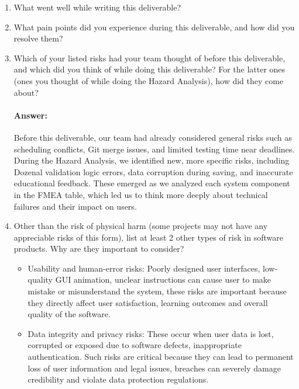 \documentclass{article}
\begin{document}



\begin{enumerate}
    \item What went well while writing this deliverable? 
    \item What pain points did you experience during this deliverable, and how
    did you resolve them?
    \item Which of your listed risks had your team thought of before this
    deliverable, and which did you think of while doing this deliverable? For
    the latter ones (ones you thought of while doing the Hazard Analysis), how
    did they come about?
    \paragraph{Answer:}
    Before this deliverable, our team had already considered general risks such as scheduling conflicts, Git merge issues, and limited testing time near deadlines.
    During the Hazard Analysis, we identified new, more specific risks, including Dozenal validation logic errors, data corruption during saving, and inaccurate educational feedback. These emerged as we analyzed each system component in the FMEA table, which led us to think more deeply about technical failures and their impact on users.
    \item Other than the risk of physical harm (some projects may not have any
    appreciable risks of this form), list at least 2 other types of risk in
    software products. Why are they important to consider? 
	\begin{itemize}
	\item Usability and human-error risks: Poorly designed user interfaces, low-quality GUI animation, unclear instructions can cause user to make mistake or misunderstand the system, these risks are important because they directly affect user satisfaction, learning outcomes and overall quality of the software.
	\item Data integrity and privacy risks: These occur when user data is lost, corrupted or exposed due to software defects, inappropriate authentication. Such risks are critical because they can lead to permanent loss of user information and legal issues, breaches can severely damage credibility and violate data protection regulations.
	
	\end{itemize}
\end{enumerate}
\end{document}

